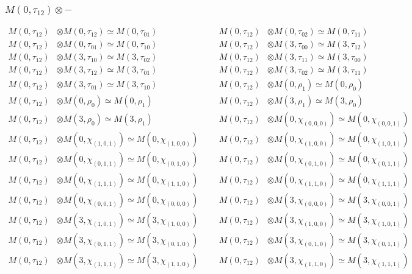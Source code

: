 \subsubsection{$ M(0,\tau_{12})\otimes -$}
\begin{align*}
M(0,\tau_{12}) &\otimes M(0,\tau_{12}) \simeq M(0,\tau_{01}) &&& M(0,\tau_{12}) &\otimes M(0,\tau_{02}) \simeq M(0,\tau_{11})\\
M(0,\tau_{12}) &\otimes M(0,\tau_{01}) \simeq M(0,\tau_{10}) &&& M(0,\tau_{12}) &\otimes M(3,\tau_{00}) \simeq M(3,\tau_{12})\\
M(0,\tau_{12}) &\otimes M(3,\tau_{10}) \simeq M(3,\tau_{02}) &&& M(0,\tau_{12}) &\otimes M(3,\tau_{11}) \simeq M(3,\tau_{00})\\
M(0,\tau_{12}) &\otimes M(3,\tau_{12}) \simeq M(3,\tau_{01}) &&& M(0,\tau_{12}) &\otimes M(3,\tau_{02}) \simeq M(3,\tau_{11})\\
M(0,\tau_{12}) &\otimes M(3,\tau_{01}) \simeq M(3,\tau_{10}) &&& M(0,\tau_{12}) &\otimes M(0,\rho_{1}) \simeq M(0,\rho_{0})\\
M(0,\tau_{12}) &\otimes M(0,\rho_{0}) \simeq M(0,\rho_{1}) &&& M(0,\tau_{12}) &\otimes M(3,\rho_{1}) \simeq M(3,\rho_{0})\\
M(0,\tau_{12}) &\otimes M(3,\rho_{0}) \simeq M(3,\rho_{1}) &&& M(0,\tau_{12}) &\otimes M(0,\chi_{(0,0,0)}) \simeq M(0,\chi_{(0,0,1)})\\
M(0,\tau_{12}) &\otimes M(0,\chi_{(1,0,1)}) \simeq M(0,\chi_{(1,0,0)}) &&& M(0,\tau_{12}) &\otimes M(0,\chi_{(1,0,0)}) \simeq M(0,\chi_{(1,0,1)})\\
M(0,\tau_{12}) &\otimes M(0,\chi_{(0,1,1)}) \simeq M(0,\chi_{(0,1,0)}) &&& M(0,\tau_{12}) &\otimes M(0,\chi_{(0,1,0)}) \simeq M(0,\chi_{(0,1,1)})\\
M(0,\tau_{12}) &\otimes M(0,\chi_{(1,1,1)}) \simeq M(0,\chi_{(1,1,0)}) &&& M(0,\tau_{12}) &\otimes M(0,\chi_{(1,1,0)}) \simeq M(0,\chi_{(1,1,1)})\\
M(0,\tau_{12}) &\otimes M(0,\chi_{(0,0,1)}) \simeq M(0,\chi_{(0,0,0)}) &&& M(0,\tau_{12}) &\otimes M(3,\chi_{(0,0,0)}) \simeq M(3,\chi_{(0,0,1)})\\
M(0,\tau_{12}) &\otimes M(3,\chi_{(1,0,1)}) \simeq M(3,\chi_{(1,0,0)}) &&& M(0,\tau_{12}) &\otimes M(3,\chi_{(1,0,0)}) \simeq M(3,\chi_{(1,0,1)})\\
M(0,\tau_{12}) &\otimes M(3,\chi_{(0,1,1)}) \simeq M(3,\chi_{(0,1,0)}) &&& M(0,\tau_{12}) &\otimes M(3,\chi_{(0,1,0)}) \simeq M(3,\chi_{(0,1,1)})\\
M(0,\tau_{12}) &\otimes M(3,\chi_{(1,1,1)}) \simeq M(3,\chi_{(1,1,0)}) &&& M(0,\tau_{12}) &\otimes M(3,\chi_{(1,1,0)}) \simeq M(3,\chi_{(1,1,1)})\\

\end{align*}
